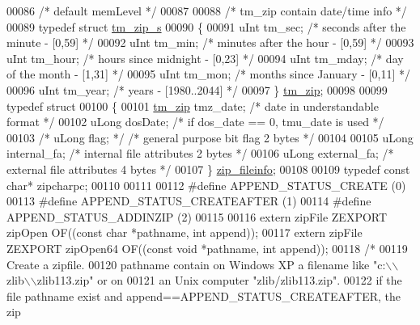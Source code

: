 \begin{DoxyCode}
00086 \textcolor{comment}{/* default memLevel */}
00087 
00088 \textcolor{comment}{/* tm\_zip contain date/time info */}
00089 \textcolor{keyword}{typedef} \textcolor{keyword}{struct }\hyperlink{structtm__zip__s}{tm\_zip\_s}
00090 \{
00091     uInt tm\_sec;            \textcolor{comment}{/* seconds after the minute - [0,59] */}
00092     uInt tm\_min;            \textcolor{comment}{/* minutes after the hour - [0,59] */}
00093     uInt tm\_hour;           \textcolor{comment}{/* hours since midnight - [0,23] */}
00094     uInt tm\_mday;           \textcolor{comment}{/* day of the month - [1,31] */}
00095     uInt tm\_mon;            \textcolor{comment}{/* months since January - [0,11] */}
00096     uInt tm\_year;           \textcolor{comment}{/* years - [1980..2044] */}
00097 \} \hyperlink{structtm__zip__s}{tm\_zip};
00098 
00099 \textcolor{keyword}{typedef} \textcolor{keyword}{struct}
00100 \{
00101     \hyperlink{structtm__zip__s}{tm\_zip}      tmz\_date;       \textcolor{comment}{/* date in understandable format           */}
00102     uLong       dosDate;       \textcolor{comment}{/* if dos\_date == 0, tmu\_date is used      */}
00103 \textcolor{comment}{/*    uLong       flag;        */}   \textcolor{comment}{/* general purpose bit flag        2 bytes */}
00104 
00105     uLong       internal\_fa;    \textcolor{comment}{/* internal file attributes        2 bytes */}
00106     uLong       external\_fa;    \textcolor{comment}{/* external file attributes        4 bytes */}
00107 \} \hyperlink{structzip__fileinfo}{zip\_fileinfo};
00108 
00109 \textcolor{keyword}{typedef} \textcolor{keyword}{const} \textcolor{keywordtype}{char}* zipcharpc;
00110 
00111 
00112 \textcolor{preprocessor}{#define APPEND\_STATUS\_CREATE        (0)}
00113 \textcolor{preprocessor}{#define APPEND\_STATUS\_CREATEAFTER   (1)}
00114 \textcolor{preprocessor}{#define APPEND\_STATUS\_ADDINZIP      (2)}
00115 
00116 \textcolor{keyword}{extern} zipFile ZEXPORT zipOpen OF((\textcolor{keyword}{const} \textcolor{keywordtype}{char} *pathname, \textcolor{keywordtype}{int} append));
00117 \textcolor{keyword}{extern} zipFile ZEXPORT zipOpen64 OF((\textcolor{keyword}{const} \textcolor{keywordtype}{void} *pathname, \textcolor{keywordtype}{int} append));
00118 \textcolor{comment}{/*}
00119 \textcolor{comment}{  Create a zipfile.}
00120 \textcolor{comment}{     pathname contain on Windows XP a filename like "c:\(\backslash\)\(\backslash\)zlib\(\backslash\)\(\backslash\)zlib113.zip" or on}
00121 \textcolor{comment}{       an Unix computer "zlib/zlib113.zip".}
00122 \textcolor{comment}{     if the file pathname exist and append==APPEND\_STATUS\_CREATEAFTER, the zip}

\end{DoxyCode}
